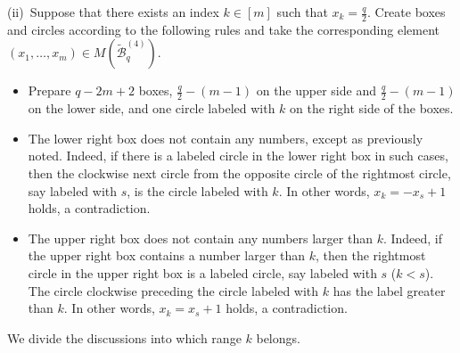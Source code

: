 \documentclass{article}
\theoremstyle{plain}
\theoremstyle{definition}
\theoremstyle{remark}
\numberwithin{equation}{section}
\begin{document}
\bigskip

(i\hspace{-0.5mm}i)\ Suppose that there exists an index $k\in[m]$ such that $\displaystyle x_k=\frac{q}{2}$.
Create boxes and circles according to the following rules and take the corresponding element $(x_1,\dots,x_m)\in M(\mathcal{\widetilde{B}}_q^{(4)})$.
\begin{itemize}
\item Prepare $q-2m+2$ boxes, $\displaystyle \frac{q}{2}-(m-1)$ on the upper side and $\displaystyle \frac{q}{2}-(m-1)$ on the lower side, 
and one circle labeled with $k$ on the right side of the boxes. 
\item The lower right box does not contain any numbers, except as previously noted. 
Indeed, if there is a labeled circle in the lower right box in such cases, then the clockwise next circle from the opposite circle of the rightmost circle, say labeled with $s$, is the circle labeled with $k$. 
In other words, $x_k=-x_s+1$ holds, a contradiction. 
\item The upper right box does not contain any numbers larger than $k$.
Indeed, if the upper right box contains a number larger than $k$, then the rightmost circle in the upper right box is a labeled circle, say labeled with $s$ ($k<s$).
The circle clockwise preceding the circle labeled with $k$ has the label greater than $k$.
In other words, $x_k=x_s+1$ holds, a contradiction.
\end{itemize}
We divide the discussions into which range $k$ belongs. 
\end{document}
